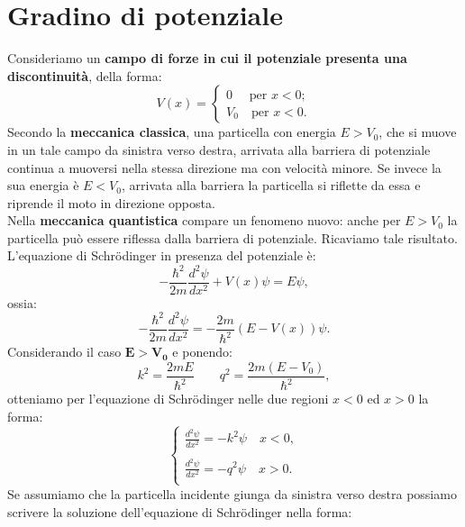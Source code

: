 \documentclass[a4paper,12pt,twoside]{book}
\begin{document}
\section{Gradino di potenziale}
Consideriamo un \textbf{campo di forze in cui il potenziale presenta una discontinuità}, della forma:
\begin{equation}
V(x)=
\begin{cases}
0 \quad \textrm{ per } x<0;\\
V_0 \quad \textrm{per } x<0.
\end{cases}
\end{equation}
Secondo la \textbf{meccanica classica}, una particella con energia $E>V_0$, che si muove in un tale campo da sinistra verso destra, arrivata alla barriera di potenziale continua a muoversi nella stessa direzione ma con velocità minore. Se invece la sua energia è $E<V_0$, arrivata alla barriera la particella si riflette da essa e riprende il moto in direzione opposta.\\
Nella \textbf{meccanica quantistica} compare un fenomeno nuovo: anche per $E>V_0$ la particella può essere riflessa dalla barriera di potenziale. Ricaviamo tale risultato.\\
L'equazione di Schr\"{o}dinger in presenza del potenziale è:
\begin{equation}
-\frac{\hbar ^2}{2m}\frac{d^2 \psi}{dx^2}+ V(x)\psi= E\psi, 
\end{equation}
ossia:
\begin{equation}
-\frac{\hbar ^2}{2m}\frac{d^2 \psi}{dx^2}= -\frac{2m}{\hbar ^2}\left( E-V(x)\right) \psi. 
\end{equation}
Considerando il caso $\mathbf{E>V_0}$ e ponendo:
\begin{equation}
k^2=\frac{2mE}{\hbar ^2} \qquad q^2=\frac{2m\left( E- V_0\right)}{\hbar ^2},
\end{equation}
otteniamo per l'equazione di Schr\"{o}dinger nelle due regioni $x<0$ ed $x>0$ la forma:
\begin{equation}
\begin{cases}
\displaystyle{\frac{d^2 \psi}{dx^2}= -k^2 \psi \quad x<0,}\\
\\
\displaystyle{\frac{d^2 \psi}{dx^2}= -q^2 \psi \quad x>0.}\\
\end{cases}
\end{equation}
Se assumiamo che la particella incidente giunga da sinistra verso destra possiamo scrivere la soluzione dell'equazione di Schr\"{o}dinger nella forma:
\end{document}
